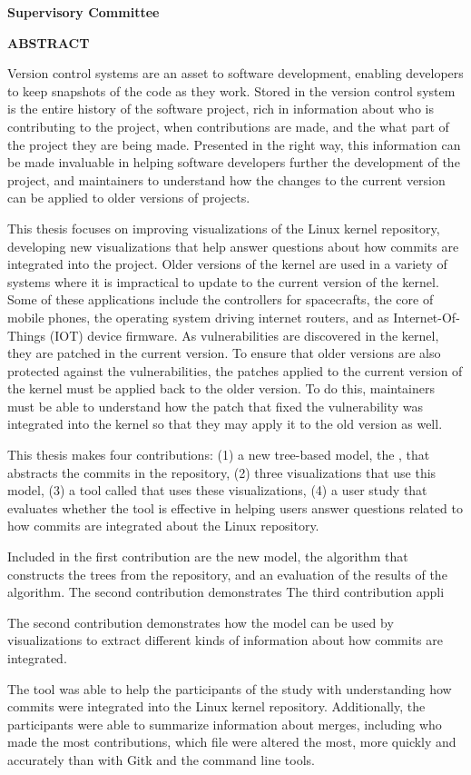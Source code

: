 \newpage
{}

\noindent \textbf{Supervisory Committee}
\tpbreak
\panel

\begin{flushleft}
  \textbf{ABSTRACT}

  Version control systems are an asset to software development, enabling
  developers to keep snapshots of the code as they work.
  Stored in the version control system is the entire history of the
  software project, rich in information about who is contributing to the
  project, when contributions are made, and the what part of the project
  they are being made.
  Presented in the right way, this information can be made invaluable in
  helping software developers further the development of the project,
  and maintainers to understand how the changes to the current version
  can be applied to older versions of projects.

  This thesis focuses on improving visualizations of the Linux kernel
  repository, developing new visualizations that help answer questions
  about how commits are integrated into the project.
  Older versions of the kernel are used in a variety of systems where it
  is impractical to update to the current version of the kernel.
  Some of these applications include the controllers for spacecrafts,
  the
  core of mobile phones, the operating system driving internet routers,
  and as Internet-Of-Things (IOT) device firmware.
  As vulnerabilities are discovered in the kernel, they are patched in
  the current version.
  To ensure that older versions are also protected against the
  vulnerabilities, the patches applied to the current version of the
  kernel must be applied back to the older version.
  To do this, maintainers must be able to understand how the patch that
  fixed the vulnerability was integrated into the kernel so that they
  may apply it to the old version as well.

  This thesis makes four contributions:
  (1) a new tree-based model, the \mt{}, that abstracts the commits in the repository,
  (2) three visualizations that use this model,
  (3) a tool called \tool{} that uses these visualizations,
  (4) a user study
  that evaluates whether the tool is effective in helping users answer
  questions related to how commits are integrated about the Linux
  repository.

  Included in the first contribution are the new model,
  the algorithm that constructs the trees from the repository,
  and an evaluation of the results of the algorithm.
  The second contribution demonstrates
  The third contribution appli

  The second contribution demonstrates how the model can be used by
  visualizations to extract different kinds of information about how
  commits are integrated.

  The tool was able to help the participants of the study with
  understanding how commits were integrated into the Linux kernel
  repository.
  Additionally, the participants were able to summarize information
  about merges,
  including who made the most contributions,
  which file were altered the most,
  more quickly and accurately than with Gitk and the command line tools.
\end{flushleft}
